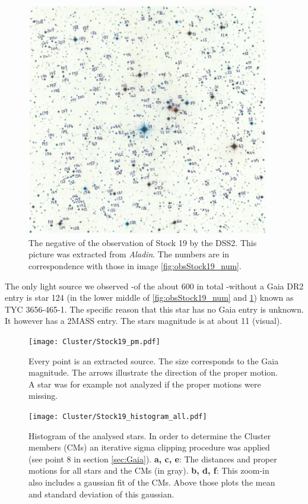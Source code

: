 \documentclass{article}
\begin{document}
\begin{figure}[H]
  \centering
    \includegraphics[width=0.95\textwidth]{Cluster/DSS2Stock19_num.jpg}
  \caption{The negative of the observation of Stock 19 by the DSS2. This picture was extracted from \textit{Aladin}. The numbers are in correspondence with those in image \ref{fig:obsStock19_num}.}
  \label{fig:DSS2Stock19_num}
\end{figure}

The only light source we observed {-}of the about 600 in total {-}without a Gaia DR2 entry is star 124 (in the lower middle of \ref{fig:obsStock19_num} and \ref{fig:DSS2Stock19_num}) known as TYC 3656-465-1. The specific reason that this star has no Gaia entry is unknown. It however has a 2MASS entry. The stars magnitude is at about 11 (visual).  

\begin{figure}[H]
  \centering
    \texttt{[image: Cluster/Stock19\_pm.pdf]}
  \caption{Every point is an extracted source. The size corresponds to the Gaia magnitude. The arrows illustrate the direction of the proper motion. A star was for example not analyzed if the proper motions were missing.}
  \label{fig:Stock19_pm}
\end{figure}

\begin{figure}[H]
  \centering
    \texttt{[image: Cluster/Stock19\_histogram\_all.pdf]}
  \caption{Histogram of the analysed stars. In order to determine the Cluster members (CMs) an iterative sigma clipping procedure was applied (see point 8 in section \ref{sec:Gaia}). \textbf{a, c, e}: The distances and proper motions for all stars and the CMs (in gray). \textbf{b, d, f}: This zoom-in also includes a gaussian fit of the CMs. Above those plots the mean and standard deviation of this gaussian.}
  \label{fig:Stock19_histogram_all}
\end{figure}
\end{document}
